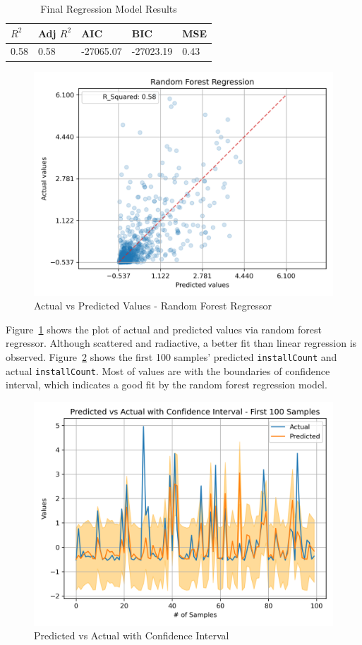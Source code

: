 \begin{table}[ht]
\centering
\begin{tabular}{|l|l|l|l|l|}
\hline
$R^2$ & Adj $R^2$ & AIC       & BIC       & MSE  \\ \hline
0.58  & 0.58   & -27065.07 & -27023.19 & 0.43 \\ \hline
\end{tabular}
\caption{Final Regression Model Results}
\label{tab:rfg-results}
\end{table}

\begin{figure}
    \centering
    \includegraphics[width=1\linewidth]{docs//assets/regressor_prediction_error.png}
    \caption{Actual vs Predicted Values - Random Forest Regressor}
    \label{fig:rfg-scatter}
\end{figure}

Figure~\ref{fig:rfg-scatter} shows the plot of actual and predicted values via random forest regressor. Although scattered and radiactive, a better fit than linear regression is observed. Figure~\ref{fig:rfg-ci} shows the first 100 samples' predicted \texttt{installCount} and actual \texttt{installCount}. Most of values are with the boundaries of confidence interval, which indicates a good fit by the random forest regression model.

\begin{figure}
    \centering
    \includegraphics[width=1\linewidth]{docs//assets/regressor_predicted_vs_actual.png}
    \caption{Predicted vs Actual with Confidence Interval}
    \label{fig:rfg-ci}
\end{figure}



